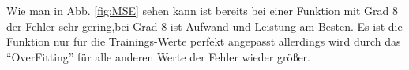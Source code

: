Wie man in Abb. \ref{fig:MSE} sehen kann ist bereits bei einer Funktion mit Grad 8 der Fehler sehr gering,bei Grad 8 ist  
Aufwand und Leistung am Besten. Es ist die Funktion nur für die Trainings-Werte 
perfekt angepasst allerdings wird durch das ``OverFitting'' für alle anderen Werte der Fehler wieder größer.